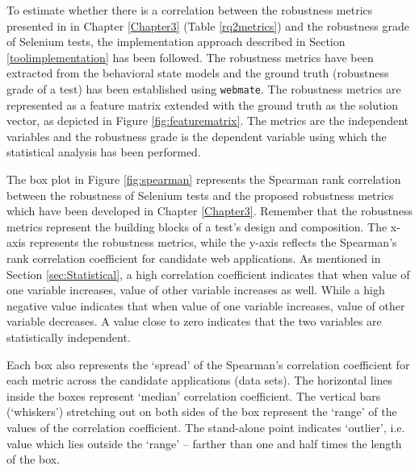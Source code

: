 To estimate whether there is a correlation between the robustness metrics presented in in Chapter \ref{Chapter3} (Table \ref{rq2metrics}) and the robustness grade of Selenium tests, the implementation approach described in Section \ref{toolimplementation} has been followed. The robustness metrics have been extracted from the behavioral state models and the ground truth (robustness grade of a test) has been established using \texttt{webmate}. The robustness metrics are represented as a feature matrix extended with the ground truth as the solution vector, as depicted in Figure \ref{fig:featurematrix}. The metrics are the independent variables and the robustness grade is the dependent variable using which the statistical analysis has been performed.

The box plot in Figure \ref{fig:spearman} represents the Spearman rank correlation between the robustness of Selenium tests and the proposed robustness metrics which have been developed in Chapter \ref{Chapter3}. Remember that the robustness metrics represent the building blocks of a test's design and composition. The x-axis represents the robustness metrics, while the y-axis reflects the Spearman's rank correlation coefficient for candidate web applications. As mentioned in Section \ref{sec:Statistical}, a high correlation coefficient indicates that when value of one variable increases, value of other variable increases as well. While a high negative value indicates that when value of one variable increases, value of other variable decreases. A value close to zero indicates that the two variables are statistically independent. 

Each box also represents the `spread' of the Spearman's correlation coefficient for each metric across the candidate applications (data sets). The horizontal lines inside the boxes represent `median' correlation coefficient. The vertical bars (`whiskers') stretching out on both sides of the box represent the `range' of the values of the correlation coefficient. The stand-alone point indicates `outlier', i.e. value which lies outside the `range' -- farther than one and half times the length of the box. 


